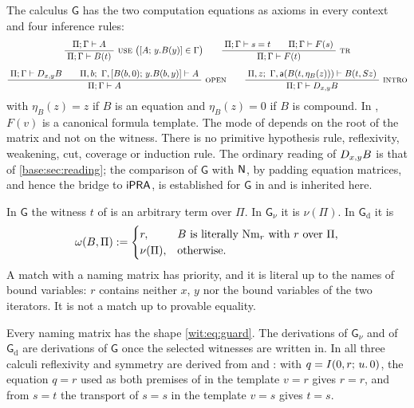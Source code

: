 The calculus $\mathsf{G}$ has the two computation equations as axioms in
every context and four inference rules:
\begin{gather*}
 \infrule{\Pi;\Gamma\proves A}{\Pi;\Gamma\proves B(t)}\ \rulename{Use}
 \ \bigl([A;\,y.B(y)]\in\Gamma\bigr)
 \qquad
 \infrule{\Pi;\Gamma\proves s=t\qquad\Pi;\Gamma\proves F(s)}
         {\Pi;\Gamma\proves F(t)}\ \rulename{Tr}
 \\[1.2ex]
 \infrule{\Pi;\Gamma\proves\D{x}{y}B\qquad
          \Pi,b;\ \Gamma,[B(b,0);\,y.B(b,y)]\proves A}
         {\Pi;\Gamma\proves A}\ \rulename{Open}
 \qquad
 \infrule{\Pi,z;\ \Gamma,\mathsf{a}(B(t,\eta_B(z)))\proves B(t,\Suc z)}
         {\Pi;\Gamma\proves\D{x}{y}B}\ \rulename{Intro}
\end{gather*}
with $\eta_B(z)=z$ if $B$ is an equation and $\eta_B(z)=0$ if $B$ is
compound.  In , $F(v)$ is a canonical formula template.  The
mode of  depends on the root of the matrix and not on the
witness.  There is no primitive hypothesis rule, reflexivity, weakening,
cut, coverage or induction rule.  The ordinary reading of $D_{x,y}B$ is
that of \cref{base:sec:reading}; the comparison of $\mathsf{G}$ with $\mathsf{N}$,
by padding equation matrices, and hence the bridge to $\mathsf{iPRA}$, is
established for $\mathsf{G}$ in  and is inherited here.

\begin{definition}
\label{wit:def:guarded}
In $\mathsf{G}$ the witness $t$ of  is an arbitrary term
over $\Pi$.  In $\mathsf{G}_{\nu}$ it is $\nu(\Pi)$.  In
$\mathsf{G}_{\mathrm d}$ it is
\[
 \omega(B,\Pi)\mathrel{:=}
 \begin{cases}
  r, & \text{$B$ is literally $\mathrm{Nm}_r$ with $r$ over $\Pi$,}\\
  \nu(\Pi), & \text{otherwise.}
 \end{cases}
\]
A match with a naming matrix has priority, and it is literal up to the names
of bound variables: $r$ contains neither $x$, $y$ nor the bound variables of
the two iterators.  It is not a match up to provable equality.
\end{definition}

Every naming matrix has the shape \eqref{wit:eq:guard}.  The derivations of
$\mathsf{G}_{\nu}$ and of $\mathsf{G}_{\mathrm d}$ are derivations of
$\mathsf{G}$ once the selected witnesses are written in.  In all three
calculi reflexivity and symmetry are derived from  and
: with $q=I(0,r;\,u.\,0)$, the equation $q=r$ used as both
premises of  in the template $v=r$ gives $r=r$, and from $s=t$
the transport of $s=s$ in the template $v=s$ gives $t=s$.

